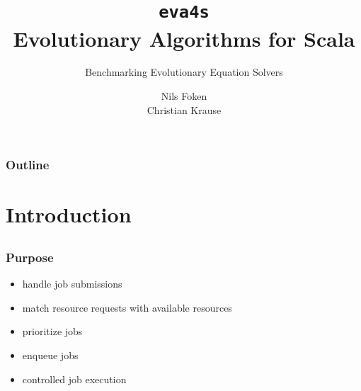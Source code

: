 \documentclass[compress,xcolor=table]{beamer}
\begin{document}
\title{\texttt{eva4s}\\Evolutionary Algorithms for Scala}
\subtitle{Benchmarking Evolutionary Equation Solvers}
\author[Foken,Krause]{Nils Foken\\Christian Krause}
\subject{Evolutionary Algorithms}

\frame[plain]{\titlepage}

\begin{frame}
  \frametitle{Outline}
  \tableofcontents[hideallsubsections]
\end{frame}


\section{Introduction}
\subsection*{}

\begin{frame}
  \frametitle{Purpose}
  \begin{itemize}
    \item handle job submissions
    \item match resource requests with available resources
    \item prioritize jobs
    \item enqueue jobs
    \item controlled job execution
  \end{itemize}
\end{frame}



\end{document}
